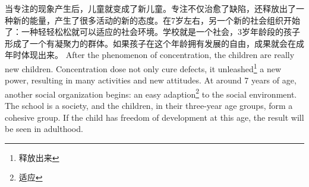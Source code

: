 \documentclass[lang=cn,10pt]{elegantbook}
\begin{document}
\begin{tcolorbox}[title=摘要,
colback=red!5!white,
colframe=red!75!black,
fonttitle=\bfseries]
当专注的现象产生后，儿童就变成了新儿童。专注不仅治愈了缺陷，还释放出了一种新的能量，产生了很多活动的新的态度。在7岁左右，另一个新的社会组织开始了：一种轻轻松松就可以适应的社会环境。学校就是一个社会，3岁年龄段的孩子形成了一个有凝聚力的群体。如果孩子在这个年龄拥有发展的自由，成果就会在成年时体现出来。
After the phenomenon of concentration, the children are really new children. Concentration dose not only cure defects, it unleashed\footnote{释放出来} a new power, resulting in many activities and new attitudes. At around 7 years of age, another social organization begins: an easy adaption\footnote{适应} to the social environment. The school is a society, and the children, in their three-year age groups, form a cohesive group. If the child has freedom of development at this age, the result will be seen in adulthood.
\end{tcolorbox}
\end{document}
